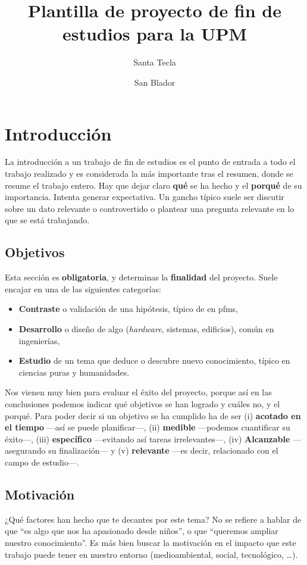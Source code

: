 \documentclass[%
    school=etsisi,%
    type=pfg,%
    degree=61CI,%
]{upm-report}
\title{Plantilla de proyecto de fin de estudios para la UPM}
\author{Santa Tecla \and San Blador}
\begin{document}
\chapter{Introducción}
\label{ch:introduccion}

La introducción a un trabajo de fin de estudios es el punto de entrada a
todo el trabajo realizado y es considerada la más importante tras el
resumen, donde se resume el trabajo entero. Hay que dejar claro
\textbf{qué} se ha hecho y el \textbf{porqué} de su importancia. Intenta
generar expectativa. Un gancho típico suele ser discutir sobre un dato
relevante o controvertido o plantear una pregunta relevante en lo que se
está trabajando.

\section{Objetivos}

Esta sección es \textbf{obligatoria}, y determinas la \textbf{finalidad}
del proyecto. Suele encajar en una de las siguientes categorías:

\begin{itemize}
    \item \textbf{Contraste} o validación de una hipótesis, típico de en
        \glspl{pfm},
    \item \textbf{Desarrollo} o diseño de algo (\textit{hardware},
        sistemas, edificios), común en ingenierías,
    \item \textbf{Estudio} de un tema que deduce o descubre nuevo
        conocimiento, típico en ciencias puras y humanidades.
\end{itemize}

Nos vienen muy bien para evaluar el éxito del proyecto, porque así en
las conclusiones podemos indicar qué objetivos se han logrado y cuáles
no, y el porqué. Para poder decir si un objetivo se ha cumplido ha de
ser (i) \textbf{acotado en el tiempo} ---así se puede planificar---,
(ii) \textbf{medible} ---podemos cuantificar su éxito---, (iii)
\textbf{específico} ---evitando así tareas irrelevantes---, (iv)
\textbf{Alcanzable}  ---asegurando su finalización--- y (v)
\textbf{relevante} ---es decir, relacionado con el campo de estudio---.

\section{Motivación}
\label{s:motivacion}

¿Qué factores han hecho que te decantes por este tema? No se refiere a
hablar de que \enquote{es algo que nos ha apasionado desde niños}, o que
\enquote{queremos ampliar nuestro conocimiento}. Es más bien buscar la
motivación en el impacto que este trabajo puede tener en nuestro entorno
(medioambiental, social, tecnológico, \ldots).
\end{document}
